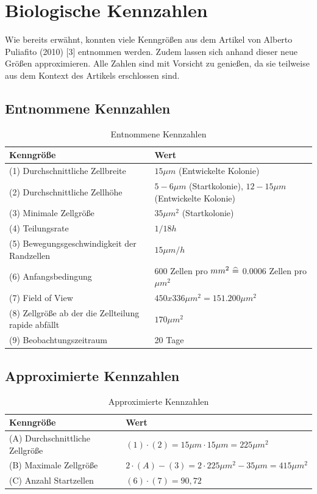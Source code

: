 \documentclass[11pt,a4paper,pointlessnumbers]{scrreprt}  %
\begin{document}
\chapter{Biologische Kennzahlen}
Wie bereits erwähnt, konnten viele Kenngrößen aus dem Artikel von Alberto Puliafito (2010) [3] entnommen werden. Zudem lassen sich anhand dieser neue Größen approximieren. Alle Zahlen sind mit Vorsicht zu genießen, da sie teilweise aus dem Kontext des Artikels erschlossen sind.  

\section{Entnommene Kennzahlen}
\begin{table}[!ht]
	\centering
	\caption{Entnommene Kennzahlen}
	\label{my-label}
	\begin{tabularx}{\textwidth}{lX}
		\toprule
		\textbf{Kenngröße} & \textbf{Wert}                                                                                          \\ \midrule
		(1) Durchschnittliche Zellbreite &	$15 \mu m$ (Entwickelte Kolonie) 
		\\
		(2) Durchschnittliche Zellhöhe & $5-6 \mu m$ (Startkolonie), $12-15 \mu m$ (Entwickelte Kolonie) 
		\\
		(3) Minimale Zellgröße & $35 \mu m ^{2}$ (Startkolonie) 
		\\
		(4) Teilungsrate & $1/18h$ 
		\\
		(5) Bewegungsgeschwindigkeit der Randzellen & $15 \mu m/h$ 
		\\
		(6) Anfangsbedingung    & 600 Zellen pro $mm^{2} \text{\space} \widehat{=} $ 0.0006 Zellen pro $\mu m^{2}$ 
		\\
		(7) Field of View & $450x336 \mu m^{2} = 151.200 \mu m^{2}$ 
		\\
		(8) Zellgröße ab der die Zellteilung rapide abfällt & $170 \mu m^{2} $
		\\
		(9) Beobachtungszeitraum & 20 Tage 
		\\ \bottomrule
	\end{tabularx}
\end{table}

\section{Approximierte Kennzahlen}
\begin{table}[!ht]
	\centering
	\caption{Approximierte Kennzahlen}
	\label{my-label}
	\begin{tabularx}{\textwidth}{lX}
		\toprule
		\textbf{Kenngröße} & \textbf{Wert}                                                                                          \\ \midrule
		(A) Durchschnittliche Zellgröße &	$(1) \cdot (2) = 15\mu m \cdot 15\mu m = 225 \mu m^{2}$ 
		\\
		(B) Maximale Zellgröße &  $2 \cdot (A) - (3) = 2 \cdot 225 \mu m^{2}-35\mu m = 415 \mu m^{2}$
		\\
		(C) Anzahl Startzellen & $(6) \cdot (7) = 90,72$
		\\ \bottomrule
	\end{tabularx}
\end{table}
\end{document}
